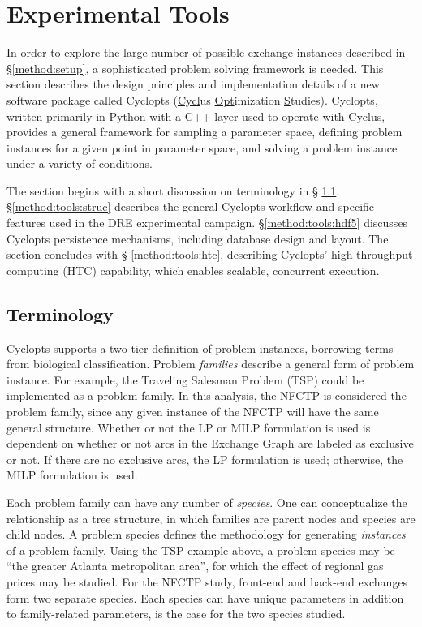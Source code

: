 
\section{Experimental Tools}\label{method:tools}

In order to explore the large number of possible exchange instances described in
\S \ref{method:setup}, a sophisticated problem solving framework is needed. This
section describes the design principles and implementation details of a new
software package called Cyclopts (\underline{Cycl}us \underline{Opt}imization
\underline{S}tudies). Cyclopts, written primarily in Python with a C++ layer
used to operate with Cyclus, provides a general framework for sampling a
parameter space, defining problem instances for a given point in parameter
space, and solving a problem instance under a variety of conditions.

The section begins with a short discussion on terminology in \S
\ref{method:tools:term}.  \S \ref{method:tools:struc} describes the general
Cyclopts workflow and specific features used in the DRE experimental
campaign. \S \ref{method:tools:hdf5} discusses Cyclopts persistence mechanisms,
including database design and layout. The section concludes with \S
\ref{method:tools:htc}, describing Cyclopts' high throughput computing (HTC)
capability, which enables scalable, concurrent execution.

\subsection{Terminology}\label{method:tools:term}

Cyclopts supports a two-tier definition of problem instances, borrowing terms
from biological classification. Problem \textit{families} describe a general
form of problem instance. For example, the Traveling Salesman Problem (TSP)
could be implemented as a problem family. In this analysis, the NFCTP is
considered the problem family, since any given instance of the NFCTP will have
the same general structure. Whether or not the LP or MILP formulation is used is
dependent on whether or not arcs in the Exchange Graph are labeled as exclusive
or not. If there are no exclusive arcs, the LP formulation is used; otherwise,
the MILP formulation is used.

Each problem family can have any number of \textit{species}. One can
conceptualize the relationship as a tree structure, in which families are parent
nodes and species are child nodes. A problem species defines the methodology for
generating \textit{instances} of a problem family. Using the TSP example above,
a problem species may be ``the greater Atlanta metropolitan area'', for which
the effect of regional gas prices may be studied. For the NFCTP study, front-end
and back-end exchanges form two separate species. Each species can have unique
parameters in addition to family-related parameters, is the case for the two
species studied.

